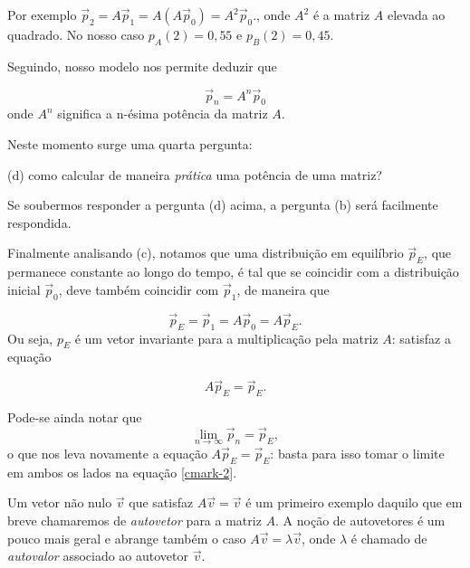 Por exemplo $ \vec p_2 = A \vec p_1= A (A \vec p_0)= A^2 \vec p_0.$, onde $A^2$ é a matriz $A$ elevada ao quadrado.
No nosso caso $p_A(2)=0,55$ e $p_B(2)=0,45$.

Seguindo, nosso modelo nos permite deduzir que

\begin{equation} \vec p_{n} = A^n \vec p_0\end{equation}
onde $A^n$ significa a n-ésima potência da matriz $A$.

Neste momento surge uma quarta pergunta:

\medskip

(d) como calcular de maneira {\it prática} uma potência de uma matriz?

\medskip

Se soubermos responder a pergunta (d) acima, a pergunta (b) será facilmente respondida.

\medskip

Finalmente analisando (c), notamos que uma distribuição em equilíbrio $\vec{p}_E$, que permanece constante ao longo do tempo, é tal que se coincidir com a  distribuição inicial $\vec p_0$, deve também coincidir com $\vec p_1$, de maneira que

\begin{equation} \vec{p}_E =  \vec p_1 = A \vec p_0 = A \vec{p}_E.\end{equation}
Ou seja, $p_E$ é um vetor invariante para a multiplicação pela matriz $A$: satisfaz a equação

\begin{equation} A \vec{p}_E =   \vec{p}_E.\end{equation}


Pode-se ainda notar que \begin{equation}\lim\limits_{n\to \infty}\vec{p}_n = \vec p_E,\end{equation} o que nos leva novamente a equação $ A \vec{p}_E = \vec{p}_E$: basta para isso tomar o limite em ambos os lados na equação \eqref{cmark-2}.

Um vetor não nulo $\vec v$ que satisfaz $A \vec v = \vec v$ é um primeiro exemplo daquilo que em breve chamaremos de {\it autovetor } para a matriz $A$. A noção de autovetores é um pouco mais geral e abrange também o caso $A \vec v = \lambda \vec v$, onde $\lambda$ é chamado de {\it autovalor } associado ao autovetor $\vec v$.

